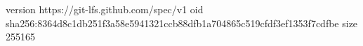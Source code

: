 version https://git-lfs.github.com/spec/v1
oid sha256:8364d8c1db251f3a58e5941321ccb88dfb1a704865c519cfdf3ef1353f7cdfbe
size 255165
